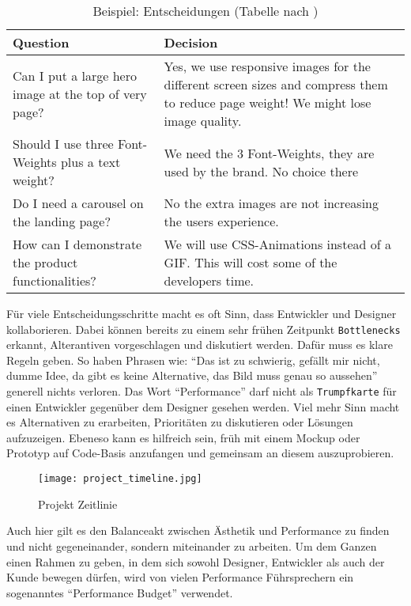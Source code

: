 			\begin{longtable}{|>{\raggedright \arraybackslash}p{7.6cm}|>{\raggedright \arraybackslash}p{7.6cm}|}
			\caption{Beispiel: Entscheidungen (Tabelle nach \autocite[p. 127]{laraHogan14})}\\
				\hline
				\textbf{Question} & \textbf{Decision}\\
				\hline
				Can I put a large hero image at the top of very page? & Yes, we use responsive images for the different screen sizes and compress them to reduce page weight! We might lose image quality.\\
				\hline
				Should I use three Font-Weights plus a text weight? & We need the 3 Font-Weights, they are used by the brand. No choice there\\
				\hline
				Do I need a carousel on the landing page? & No the extra images are not increasing the users experience.\\
				\hline
				How can I demonstrate the product functionalities? & We will use CSS-Animations instead of a GIF. This will cost some of the developers time.\\
				\hline	
			\end{longtable}

			Für viele Entscheidungsschritte macht es oft Sinn, dass Entwickler und Designer kollaborieren. Dabei können bereits zu einem sehr frühen Zeitpunkt \texttt{Bottlenecks} erkannt, Alterantiven vorgeschlagen und diskutiert werden. Dafür muss es klare Regeln geben. So haben Phrasen wie: "`Das ist zu schwierig, gefällt mir nicht, dumme Idee, da gibt es keine Alternative, das Bild muss genau so aussehen"' generell nichts verloren. Das Wort "`Performance"' darf nicht als \texttt{Trumpfkarte} für einen Entwickler gegenüber dem Designer gesehen werden. Viel mehr Sinn macht es Alternativen zu erarbeiten, Prioritäten zu diskutieren oder Lösungen aufzuzeigen. Ebeneso kann es hilfreich sein, früh mit einem Mockup oder Prototyp auf Code-Basis anzufangen und gemeinsam an diesem auszuprobieren.

			\begin{figure}[htbp]
				\texttt{[image: project\_timeline.jpg]}
				\caption{Projekt Zeitlinie}
				\label{fig:project_timeline}
			\end{figure}
			
			Auch hier gilt es den Balanceakt zwischen Ästhetik und Performance zu finden und nicht gegeneinander, sondern miteinander zu arbeiten. Um dem Ganzen einen Rahmen zu geben, in dem sich sowohl Designer, Entwickler als auch der Kunde bewegen dürfen, wird von vielen Performance Führsprechern ein sogenanntes "`Performance Budget"' verwendet.
		
